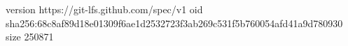 version https://git-lfs.github.com/spec/v1
oid sha256:68c8af89d18e01309f6ae1d2532723f3ab269c531f5b760054afd41a9d780930
size 250871
